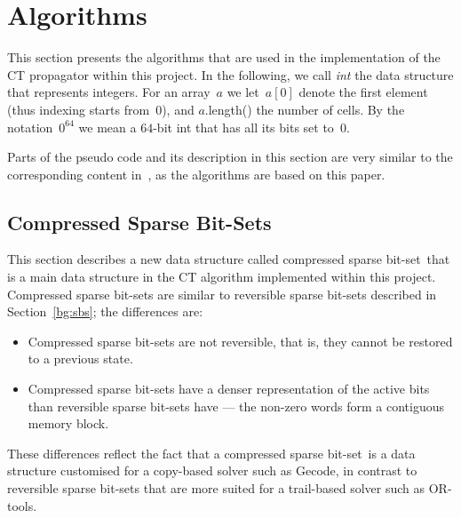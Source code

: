 \documentclass[a4paper,11pt]{article}
\theoremstyle{definition}
\newcommand{\Secref}[1]{Section~\ref{#1}}
\newcommand{\BitSet}[0]{Compressed Sparse Bit-Set}
\newcommand{\bitset}[0]{compressed sparse bit-set}
\newcommand{\Bitset}[0]{Compressed sparse bit-set}
\newcommand{\CTpaper}[0]{DBLP:conf/cp/DemeulenaereHLP16}
\numberwithin{equation}{section}
\begin{document}

\section{Algorithms}
\label{sec:algorithms}


This section presents the algorithms that are used in the implementation of the
CT propagator within this project.
In the following, we call \emph{int} the data structure that represents
integers. For an array~$a$ we let~$a[0]$ denote the first element
(thus indexing starts from~$0$), and
$a$.length() the number of cells.
By the notation~$0^{64}$ we mean a $64$-bit int that has all its
bits set to~$0$.

Parts of the pseudo code and its description in this section are very
similar to the corresponding content in~\cite{\CTpaper}, as the algorithms
are based on this paper.


\subsection{{\BitSet}s}
\label{sec:sbs}
This section describes a new data structure called
\bitset~that is a main data structure
in the CT algorithm implemented within this project. {\Bitset}s are similar to
reversible sparse bit-sets described in \Secref{bg:sbs};
the differences are:
\begin{itemize}
  \item {\Bitset}s are not reversible, that is, they cannot be restored to a previous
    state.
  \item {\Bitset}s have a denser representation of the active bits than reversible sparse
    bit-sets have --- the non-zero words form a contiguous memory block.
\end{itemize}
These differences reflect the fact that a \bitset~is a data structure customised
for a copy-based solver such as Gecode, in contrast to reversible sparse bit-sets
that are more suited for a trail-based solver such as OR-tools.
\end{document}
